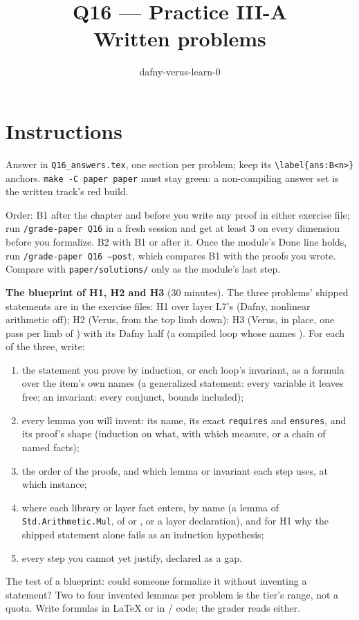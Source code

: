 \documentclass[11pt]{article}
\title{Q16 --- Practice III-A \\ \large Written problems}
\author{dafny-verus-learn-0}
\date{}
\begin{document}
\maketitle

\section*{Instructions}
Answer in \texttt{Q16\_answers.tex}, one section per problem; keep its
\verb+\label{ans:B<n>}+ anchors. \texttt{make -C paper paper} must stay green:
a non-compiling answer set is the written track's red build.

Order: B1 after the chapter and before you write any proof in either
exercise file; run \texttt{/grade-paper Q16} in a fresh session and get at
least 3 on every dimension before you formalize. B2 with B1 or after it. Once
the module's Done line holds, run \texttt{/grade-paper Q16 --post}, which
compares B1 with the proofs you wrote. Compare with \texttt{paper/solutions/}
only as the module's last step.

\begin{problem}\label{prob:B1}
\textbf{The blueprint of H1, H2 and H3} (30 minutes). The three problems'
shipped statements are in the exercise files: H1  over layer
L7's  (Dafny, nonlinear arithmetic off); H2 
(Verus, from the top limb down); H3  (Verus, in place, one pass per
limb of ) with its Dafny half  (a compiled loop whose
 names ). For each of the three, write:
\begin{enumerate}
\item[(a)] the statement you prove by induction, or each loop's invariant,
  as a formula over the item's own names (a generalized statement: every
  variable it leaves free; an invariant: every conjunct, bounds included);
\item[(b)] every lemma you will invent: its name, its exact \texttt{requires}
  and \texttt{ensures}, and its proof's shape (induction on what, with which
  measure, or a chain of named facts);
\item[(c)] the order of the proofs, and which lemma or invariant each step
  uses, at which instance;
\item[(d)] where each library or layer fact enters, by name (a lemma of
  \texttt{Std.Arithmetic.Mul}, of  or
  , or a layer declaration), and for H1 why
  the shipped statement alone fails as an induction hypothesis;
\item[(e)] every step you cannot yet justify, declared as a gap.
\end{enumerate}
The test of a blueprint: could someone formalize it without inventing a
statement? Two to four invented lemmas per problem is the tier's range, not
a quota. Write formulas in \LaTeX{} or in / code; the
grader reads either.
\end{problem}
\end{document}
